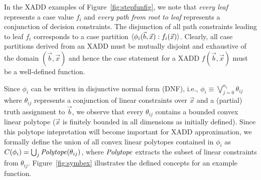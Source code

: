 In the XADD examples of Figure~\ref{fig:stepfunfig}, we note that 
\emph{every leaf} represents a case value $f_i$ and 
\emph{every path from root to leaf} represents a conjunction
of decision constraints.  The disjunction of all path constraints
leading to leaf $f_i$ corresponds to a case partition
$\langle \phi_i(\vec{b},\vec{x}) : f_i(\vec{x}) \rangle$.  Clearly, all case
partitions derived from an XADD must be mutually disjoint and
exhaustive of the domain $(\vec{b},\vec{x})$ and hence the 
case statement for a XADD $f(\vec{b},\vec{x})$ must be a well-defined
function.

%

%
Since $\phi_i$ can be written in disjunctive normal form (DNF), i.e.,
$\phi_i \equiv \bigvee_{j=0}^{n_i} \theta_{ij}$ where $\theta_{ij}$
represents a conjunction of linear constraints over $\vec{x}$ and a
(partial) truth assignment to $\vec{b}$, we observe that every
$\theta_{ij}$ contains a bounded convex linear polytope ($\vec{x}$ is
finitely bounded in all dimensions as initially defined).  Since this
polytope intepretation will become important for XADD approximation,
we formally define the union of all convex linear polytopes contained in 
$\phi_i$ as
$C(\phi_i) = \bigcup_j \mathit{Polytope}(\theta_{ij})$, 
where $\mathit{Polytope}$ extracts the subset of linear constraints from
$\theta_{ij}$. Figure~\ref{fig:symbex} illustrates the defined concepts for an example function.

